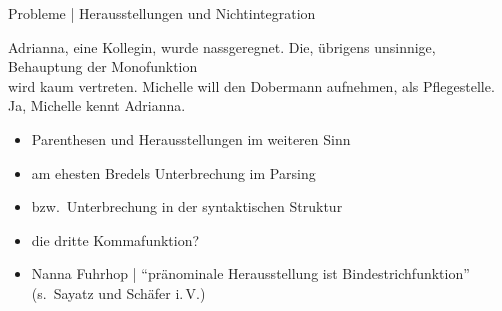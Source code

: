 \begin{frame}
  {Probleme | Herausstellungen und Nichtintegration}
  \onslide<+->
  \onslide<+->
  \begin{exe}
    \ex Adrianna, \alert{eine Kollegin}, wurde nassgeregnet.
    \ex Die, \alert{übrigens unsinnige}, Behauptung der Monofunktion\\
    wird kaum vertreten.
    \ex Michelle will den Dobermann aufnehmen, \alert{als Pflegestelle}.
    \ex \alert{Ja}, Michelle kennt Adrianna.
  \end{exe}
  \onslide<+->
  \Halbzeile
  \begin{itemize}[<+->]
    \item \alert{Parenthesen} und \alert{Herausstellungen} im weiteren Sinn
    \item am ehesten Bredels Unterbrechung im Parsing
    \item bzw.\ \alert{Unterbrechung in der syntaktischen Struktur}
    \item die \alert{dritte Kommafunktion}?
      \Halbzeile
    \item Nanna Fuhrhop | "`pränominale Herausstellung ist Bindestrichfunktion"'\\
       (s.\ Sayatz und Schäfer i.\,V.)
  \end{itemize}
\end{frame}

